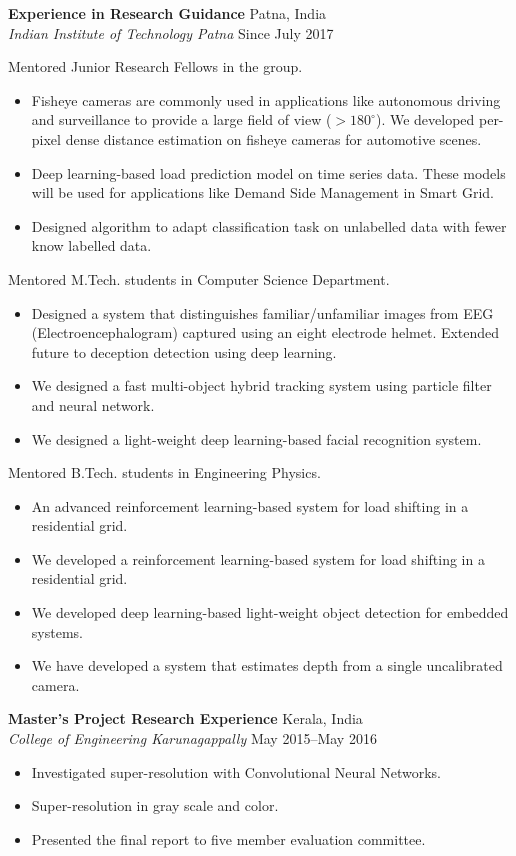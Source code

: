 \documentclass[12pt]{res} %
\begin{document}
\begin{resume}
\textbf {Experience in Research Guidance} \hfill Patna, India \\ 
{\sl Indian Institute of Technology Patna} \hfill Since July 2017

Mentored Junior Research Fellows in the group.
\begin{itemize}
\item Fisheye cameras are commonly used in applications like autonomous driving and surveillance to provide a large field of view ($>180^{\circ}$). We developed per-pixel dense distance estimation on fisheye cameras for automotive scenes. 
\item Deep learning-based load prediction model on time series data. These models will be used for applications like Demand Side Management in Smart Grid.
\item Designed algorithm to adapt classification task on unlabelled data with fewer know labelled data. 
\end{itemize}


Mentored M.Tech. students in Computer Science Department.
\begin{itemize}
\item Designed a system that distinguishes familiar/unfamiliar images from EEG (Electroencephalogram) captured using an eight electrode helmet. Extended future to deception detection using deep learning.
\item We designed a fast multi-object hybrid tracking system using particle filter and neural network.
\item We designed a light-weight deep learning-based facial recognition system.
\end{itemize}

Mentored B.Tech. students in Engineering Physics. 
\begin{itemize}
\item An advanced reinforcement learning-based system for load shifting in a residential grid.
\item We developed a reinforcement learning-based system for load shifting in a residential grid. 
\item We developed deep learning-based light-weight object detection for embedded systems.
\item We have developed a system that estimates depth from a single uncalibrated camera.
\end{itemize}

\textbf {Master's Project Research Experience} \hfill  Kerala, India \\ 
{\sl College of Engineering Karunagappally} \hfill May 2015--May 2016 
\vspace{5pt}
\begin{itemize}
\item Investigated super-resolution with Convolutional Neural Networks.
\item Super-resolution in gray scale and color.
\item Presented the final report to five member evaluation committee.
\end{itemize}




\end{resume}
\end{document}
